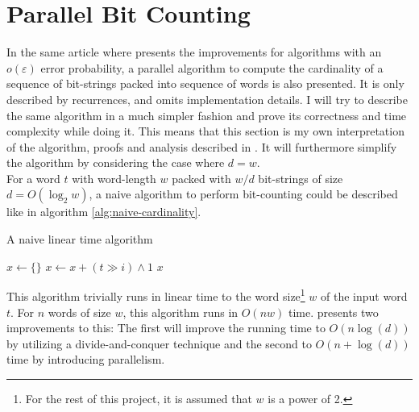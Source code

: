 \section{Parallel Bit Counting}
In the same article where \citet{fast-similarity-search} presents the improvements for algorithms with an $o(\varepsilon)$ error probability, a parallel algorithm to compute the cardinality of a sequence of bit-strings packed into sequence of words is also presented. It is only described by recurrences, and omits implementation details. I will try to describe the same algorithm in a much simpler fashion and prove its correctness and time complexity while doing it. This means that this section is my own interpretation of the algorithm, proofs and analysis described in \cite{fast-similarity-search}.
It will furthermore simplify the algorithm by considering the case where $d=w$.\\
For a word $t$ with word-length $w$ packed with $w/d$ bit-strings of size $d = O(\log_2{w})$, a naive algorithm to perform bit-counting could be described like in algorithm \ref{alg:naive-cardinality}.
\begin{algorithm}[H]
\caption{A naive linear time algorithm}\label{alg:naive-cardinality}
\begin{algorithmic}[1]
\State $x \gets \{\}$
\State $x \gets x + (t \gg i) \land 1$
\EndFor
\EndFor
\State \Return $x$
\EndFunction
\end{algorithmic}
\end{algorithm}
This algorithm trivially runs in linear time to the word size\footnote{For the rest of this project, it is assumed that $w$ is a power of 2.} $w$ of the input word $t$. For $n$ words of size $w$, this algorithm runs in $O(n w)$ time.
\citet{fast-similarity-search} presents two improvements to this: The first will improve the running time to $O(n\log(d))$ by utilizing a divide-and-conquer technique and the second to $O(n + \log(d))$ time by introducing parallelism. %
